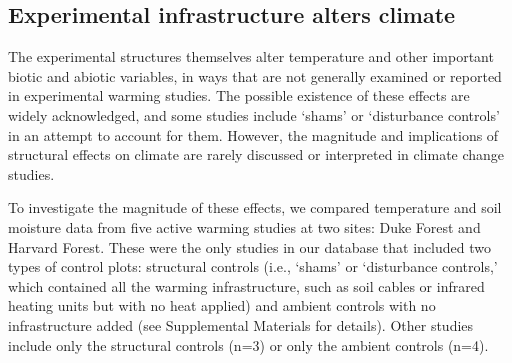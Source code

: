 \documentclass{article}
\begin{document}
\subsection* {Experimental infrastructure alters climate}
The experimental structures themselves alter temperature and other important biotic and abiotic variables, in ways that are not generally examined or reported in experimental warming studies. The possible existence of these effects are widely acknowledged, and some studies include `shams' or `disturbance controls' in an attempt to account for them. %
However, the magnitude and implications of structural effects on climate are rarely discussed or interpreted in climate change studies.
\par To investigate the magnitude of these effects, we compared temperature and soil moisture data from five active warming studies at two sites: Duke Forest and Harvard Forest\citep{farnsworth1995,clark2014a, marchin2015, pelini2011}. These were the only studies in our database that included two types of control plots: structural controls (i.e., `shams' or `disturbance controls,' which contained all the warming infrastructure, such as soil cables or infrared heating units but with no heat applied) and ambient controls with no infrastructure added (see Supplemental Materials for details). Other studies include only the structural controls (n=3) or only the ambient controls (n=4).
\end{document}
